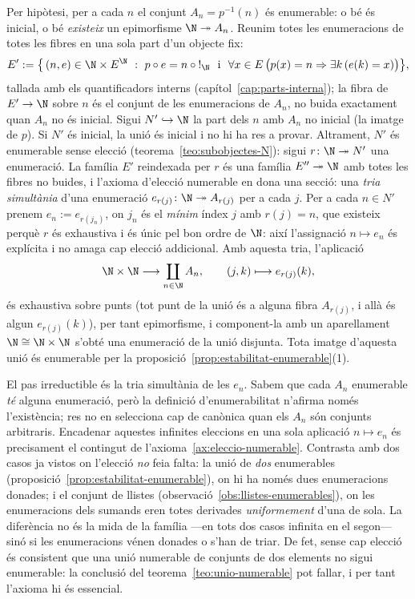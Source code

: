 \begin{prova}
Per hipòtesi, per a cada \(n\) el conjunt \(A_n=p^{-1}(n)\) és enumerable:
o bé és inicial, o bé \emph{existeix} un epimorfisme
\(\N\twoheadrightarrow A_n\). Reunim totes les enumeracions de totes les
fibres en una sola part d'un objecte fix:
\[
E':=\bigl\{\,(n,e)\in\N\times E^{\N}\ :\ p\circ e=n\circ{!}_\N
\ \text{ i }\ \forall x\in E\,\bigl(p(x)=n\Rightarrow\exists k\,(e(k)=x)\bigr)\bigr\},
\]
tallada amb els quantificadors interns (capítol~\ref{cap:parts-interna});
la fibra de \(E'\to\N\) sobre \(n\) és el conjunt de les enumeracions de
\(A_n\), no buida exactament quan \(A_n\) no és inicial. Sigui
\(N'\hookrightarrow\N\) la part dels \(n\) amb \(A_n\) no inicial (la imatge
de \(p\)). Si \(N'\) és inicial, la unió és inicial i no hi ha res a
provar. Altrament, \(N'\) és enumerable sense elecció
(teorema~\ref{teo:subobjectes-N}): sigui \(r\colon\N\twoheadrightarrow N'\)
una enumeració. La família \(E'\) reindexada per \(r\) és una família
\(E''\twoheadrightarrow\N\) amb totes les fibres no buides, i l'axioma
d'elecció numerable en dona una secció: una \emph{tria simultània} d'una
enumeració \(e_{r(j)}\colon\N\twoheadrightarrow A_{r(j)}\) per a cada
\(j\). Per a cada \(n\in N'\) prenem \(e_n:=e_{r(j_n)}\), on \(j_n\) és
el \emph{mínim} índex \(j\) amb \(r(j)=n\), que existeix perquè \(r\) és
exhaustiva i és únic pel bon ordre de \(\N\): així l'assignació
\(n\mapsto e_n\) és explícita i no amaga cap elecció addicional. Amb aquesta tria, l'aplicació
\[
\N\times\N\longrightarrow\coprod_{n\in\N}A_n,
\qquad
(j,k)\longmapsto e_{r(j)}(k),
\]
és exhaustiva sobre punts (tot punt de la unió és a alguna fibra
\(A_{r(j)}\), i allà és algun \(e_{r(j)}(k)\)), per tant epimorfisme, i component-la amb un aparellament
\(\N\cong\N\times\N\) s'obté una enumeració de la unió disjunta. Tota
imatge d'aquesta unió és enumerable per la
proposició~\ref{prop:estabilitat-enumerable}(1).
\end{prova}

\begin{observacio}[On és l'elecció, i on no]\label{obs:eleccio-unio}
El pas irreductible és la tria simultània de les \(e_n\). Sabem que
cada \(A_n\) enumerable \emph{té} alguna enumeració, però la definició
d'enumerabilitat n'afirma només l'existència; res no en selecciona cap de
canònica quan els \(A_n\) són conjunts arbitraris. Encadenar aquestes
infinites eleccions en una sola aplicació \(n\mapsto e_n\) és precisament
el contingut de l'axioma~\ref{ax:eleccio-numerable}. Contrasta amb dos
casos ja vistos on l'elecció \emph{no} feia falta: la unió de \emph{dos}
enumerables (proposició~\ref{prop:estabilitat-enumerable}), on hi ha només
dues enumeracions donades; i el conjunt de llistes
(observació~\ref{obs:llistes-enumerables}), on les enumeracions dels
sumands eren totes derivades \emph{uniformement} d'una de sola. La
diferència no és la mida de la família ---en tots dos casos infinita en el
segon--- sinó si les enumeracions vénen donades o s'han de triar. De fet,
sense cap elecció és consistent que una unió numerable de conjunts de dos
elements no sigui enumerable: la conclusió del
teorema~\ref{teo:unio-numerable} pot fallar, i per tant l'axioma hi és
essencial.
\end{observacio}


